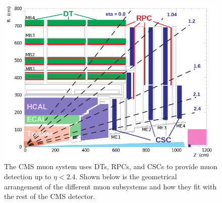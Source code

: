 \begin{figure}[tb]
\caption[The CMS Muon System]{
 The CMS muon system uses DTs, RPCs,
  and CSCs to provide muon detection
  up to $\eta < 2.4$.
 Shown below is the geometrical arrangement
  of the different muon
  subsystems and how they fit with
  the rest of the CMS detector.
 }
\label{fig:muon}
\includegraphics[width=\textwidth]{pdfs/experiment/cms_muon.png}
\end{figure}
 


